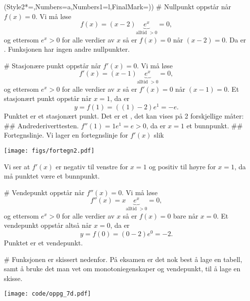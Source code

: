 \begin{easylist}[enumerate]
\ListProperties(Style2*=,Numbers=a,Numbers1=l,FinalMark={)})
# Nullpunkt oppstår når $f(x) = 0$. Vi må løse
\begin{equation*}
	f(x) = (x - 2) \underset{\text{alltid } > 0}{\underbrace{e^x}} = 0,
\end{equation*}
og ettersom $e^x > 0$ for alle verdier av $x$ så er $f(x) = 0$ når $(x-2) = 0$.
Da er .
Funksjonen har ingen andre nullpunkter.

# Stasjonære punkt oppstår når $f'(x) = 0$. Vi må løse
\begin{equation*}
f'(x) = (x - 1) \underset{\text{alltid } > 0}{\underbrace{e^x}} = 0,
\end{equation*}
og ettersom $e^x > 0$ for alle verdier av $x$ så er $f'(x) = 0$ når $(x-1) = 0$.
Et stasjonært punkt oppstår når $x = 1$, da er 
\begin{equation*}
	y = f(1) = ((1) - 2) e^1 = -e.
\end{equation*}
Punktet  er et stasjonært punkt.
Det er et , det kan vises på 2 forskjellige måter:
## Andrederiverttesten. $f''(1) = 1 e^1 = e > 0$, da er $x = 1$ et bunnpunkt.
## Fortegnslinje. Vi lager en fortegnslinje for $f'(x)$ slik
\begin{center}
	\texttt{[image: figs/fortegn2.pdf]}
\end{center}
Vi ser at $f'(x)$ er negativ til venstre for $x = 1$ og positiv til høyre for $x = 1$, da må punktet være et bunnpunkt.

# Vendepunkt oppstår når $f''(x) = 0$. Vi må løse
\begin{equation*}
f''(x) = x \underset{\text{alltid } > 0}{\underbrace{e^x}} = 0,
\end{equation*}
og ettersom $e^x > 0$ for alle verdier av $x$ så er $f(x) = 0$ bare når $x = 0$.
Et vendepunkt oppstår altså når $x = 0$, da er 
\begin{equation*}
y = f(0) = (0 - 2) e^0 = -2.
\end{equation*}
Punktet  er et vendepunkt.


# Funksjonen er skissert nedenfor.
På eksamen er det nok best å lage en tabell, samt å bruke det man vet om monotoniegenskaper og vendepunkt, til å lage en skisse.
\begin{center}
	\texttt{[image: code/oppg\_7d.pdf]}
\end{center}


\end{easylist}

